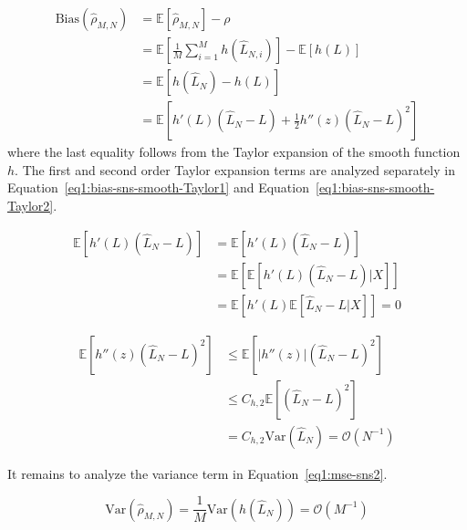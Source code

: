\begin{align} \label{eq1:bias-sns-smooth}
    \text{Bias}(\hat{\rho}_{M, N})
    & = \mathbb{E} \left[ \hat{\rho}_{M, N} \right] - \rho \nonumber \\
    & = \mathbb{E} \left[ \frac{1}{M} \sum_{i=1}^M h\left( \hat{L}_{N, i} \right) \right] - \mathbb{E} \left[ h\left(L \right) \right]  \nonumber \\
    & = \mathbb{E} \left[ h\left( \hat{L}_N \right) - h\left( L \right) \right] \nonumber \\
    & = \mathbb{E} \left[h'\left( L \right) \left( \hat{L}_N - L \right) + \frac{1}{2} h''\left( z \right) \left( \hat{L}_N - L \right)^2 \right]
\end{align}
where the last equality follows from the Taylor expansion of the smooth function $h$.
The first and second order Taylor expansion terms are analyzed separately in Equation~\ref{eq1:bias-sns-smooth-Taylor1} and Equation~\ref{eq1:bias-sns-smooth-Taylor2}.

\begin{align} \label{eq1:bias-sns-smooth-Taylor1}
    \mathbb{E} \left[ h'\left( L \right) \left( \hat{L}_N - L \right) \right]
    & = \mathbb{E} \left[ h'\left( L \right) \left( \hat{L}_N - L \right) \right] \nonumber \\
    & = \mathbb{E} \left[ \mathbb{E} \left[ h'\left( L \right) \left( \hat{L}_N - L \right)  | X \right] \right] \nonumber \\
    & = \mathbb{E} \left[ h'\left( L \right) \mathbb{E} \left[ \hat{L}_N - L  | X \right] \right] = 0
\end{align}

\begin{align} \label{eq1:bias-sns-smooth-Taylor2}
    \mathbb{E} \left[ h''\left( z \right) \left( \hat{L}_N - L \right)^2 \right]
    & \leq \mathbb{E} \left[ |h''\left( z \right)| \left( \hat{L}_N - L \right)^2 \right] \nonumber \\
    & \leq C_{h,2} \mathbb{E} \left[ \left( \hat{L}_N - L \right)^2 \right] \nonumber \\
    & = C_{h,2} \text{Var}(\hat{L}_N) = \mathcal{O}\left( N^{-1} \right)
\end{align}

It remains to analyze the variance term in Equation~\ref{eq1:mse-sns2}.

\begin{equation} \label{eq1:var-sns-smooth}
    \text{Var}(\hat{\rho}_{M, N}) = \frac{1}{M} \text{Var}(h(\hat{L}_N)) = \mathcal{O}(M^{-1})
\end{equation}

